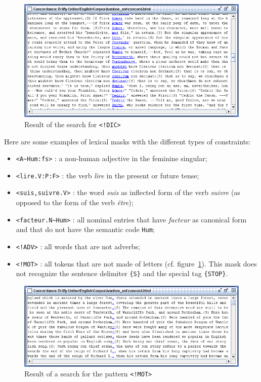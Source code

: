 \begin{figure}[h]
\begin{center}
\includegraphics[width=15cm]{resources/img/fig4-1.png}
\caption{Result of the search for \texttt{<!DIC>}}
\end{center}
\end{figure}

\noindent Here are some examples of lexical masks with the different types of constraints:

\begin{itemize}
  \item \verb$<A~Hum:fs>$ : a non-human adjective in the feminine singular;
  \item \verb+<lire.V:P:F>+ : the verb \textit{lire} in the present or future
  tense;
  \item \verb$<suis,suivre.V>$ : the word \textit{suis} as inflected form of the
  verb \textit{suivre} (as opposed to the form of the verb \textit{\^etre});
  \item \verb$<facteur.N~Hum>$ : all nominal entries that have \textit{facteur} as
  canonical form and that do not have the semantic code \verb+Hum+;
  \item \verb$<!ADV>$ : all words that are not adverbs;
  \item \verb$<!MOT>$ : all tokens that are not made of letters (cf.
  figure~\ref{fig-search-<!MOT>}). This mask does not recognize the sentence
  delimiter \verb+{S}+ and the special tag \verb+{STOP}+.
\end{itemize}

\bigskip
\begin{figure}[h]
\begin{center}
\includegraphics[width=15cm]{resources/img/fig4-2.png}
\caption{Result of a search for the pattern
\texttt{<!MOT>}\label{fig-search-<!MOT>}}
\end{center}
\end{figure}

